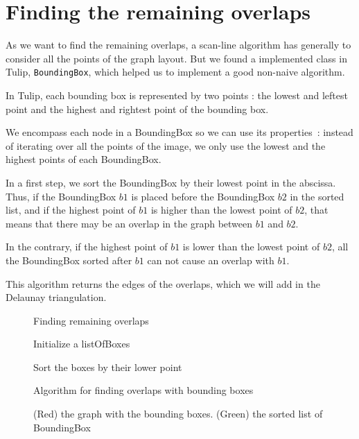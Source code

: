 \documentclass[12pt]{report}
\begin{document}
\section{Finding the remaining overlaps}
As we want to find the remaining overlaps, a scan-line algorithm has generally to consider all the points of the graph layout. But we found a implemented class in Tulip, \texttt{BoundingBox}, which helped us to implement a good non-naive algorithm. 

\bigskip
In Tulip, each bounding box is represented by two points : the lowest and leftest point and the highest and rightest point of the bounding box.

We encompass each node in a BoundingBox so we can use its properties~: instead of iterating over all the points of the image, we only use the lowest and the highest points of each BoundingBox. 

\bigskip
In a first step, we sort the BoundingBox by their lowest point in the abscissa. Thus, if the BoundingBox $b1$ is placed before the BoundingBox $b2$ in the sorted list, and if the highest point of $b1$ is higher than the lowest point of $b2$, that means that there may be an overlap in the graph between $b1$ and $b2$. 

In the contrary, if the highest point of $b1$ is lower than the lowest point of $b2$, all the BoundingBox sorted after $b1$ can not cause an overlap with $b1$.

\bigskip
This algorithm returns the edges of the overlaps, which we will add in the Delaunay triangulation.

\begin{figure}
\begin{algorithm}[H]
\caption{Finding remaining overlaps}
Initialize a listOfBoxes

Sort the boxes by their lower point

	{}
\end{algorithm}
\caption{Algorithm for finding overlaps with bounding boxes}
\label{algscanline}
\end{figure}

\begin{figure}[h]
  \center
  \setlength\fboxsep{5pt}
  \setlength\fboxrule{0.5pt}
  \caption{(Red) the graph with the bounding boxes. (Green) the sorted list of BoundingBox}
  \label{scanline}
\end{figure}
\end{document}
